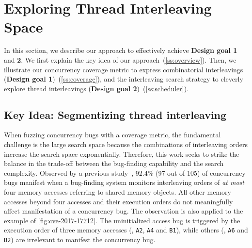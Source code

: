 \section{Exploring Thread Interleaving Space}
\label{s:design}

In this section, we describe our approach to effectively achieve
\textbf{Design goal 1} and \textbf{2}.
%
We first explain the key idea of our approach~(\autoref{ss:overview}).
Then, we illustrate our concurrency coverage metric to express
combinatorial interleavings (\textbf{Design goal
  1})~(\autoref{ss:coverage}), and the interleaving search strategy to
cleverly explore thread interleavings (\textbf{Design goal
  2})~(\autoref{ss:scheduler}).


\subsection{Key Idea: Segmentizing thread interleaving}
\label{ss:overview}



When fuzzing concurrency bugs with a coverage metric, the fundamental
challenge is the large search space because the combinations of
interleaving orders increase the search space exponentially.
%
Therefore, this work seeks to strike the balance in the trade-off
between the bug-finding capability and the search complexity.
%
Observed by a previous study~\cite{learningfrommistakes}, 92.4\% (97
out of 105) of concurrency bugs manifest when a bug-finding system
monitors interleaving orders of \textit{at most} four memory accesses
referring to shared memory objects.
%
All other memory accesses beyond four accesses and their execution
orders do not meaningfully affect manifestation of a concurrency bug.
%
The observation is also applied to the example of
\autoref{fig:cve-2017-17712}. The uninitialized access bug is
triggered by the execution order of three memory accesses (\eg,
\texttt{A2}, \texttt{A4} and \texttt{B1}), while others (\eg,
\texttt{A6} and \texttt{B2}) are irrelevant to manifest the
concurrency bug.


